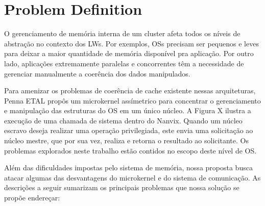 \section{Problem Definition}
\label{sec:problem}

	O gerenciamento de memória interna de um cluster afeta todos os níveis de
	abstração no contexto dos LWs. Por exemplos, OSs precisam ser pequenos
	e leves para deixar a maior quantidade de memória disponível pra aplicação.
	Por outro lado, aplicações extremamente paralelas e concorrentes têm
	a necessidade de gerenciar manualmente a coerência dos dados manipulados.

	Para amenizar os problemas de coerência de
	cache existente nessas arquiteturas, Penna ETAL propôs um microkernel
	assímetrico para concentrar o gerenciamento e manipulação das estruturas do
	OS em um único núcleo. A Figura X ilustra a execução de uma chamada de
	sistema dentro do Nanvix. Quando um núcleo escravo deseja realizar uma operação
	privilegiada, este envia uma solicitação ao núcleo mestre, que por sua vez,
	realiza e retorna o resultado ao solicitante. Os problemas explorados neste
	trabalho estão contidos no escopo deste nível de OS.

	Além das dificuldades impostas pelo sistema de memória, nossa proposta
	busca atacar algumas das desvantagens do microkernel e do sistema de
	comunicação. As descrições a seguir sumarizam os principais problemas que nossa
	solução se propõe endereçar:
	

